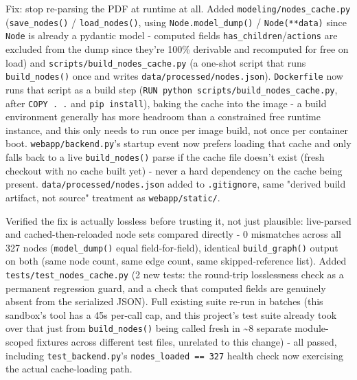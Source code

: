 Fix: stop re-parsing the PDF at runtime at all. Added \texttt{modeling/\allowbreak{}nodes\_\allowbreak{}cache.py} (\texttt{save\_\allowbreak{}nodes()} / \texttt{load\_\allowbreak{}nodes()}, using \texttt{Node.model\_\allowbreak{}dump()} / \texttt{Node(**data)} since \texttt{Node} is already a pydantic model - computed fields \texttt{has\_\allowbreak{}children}/\texttt{actions} are excluded from the dump since they're 100\% derivable and recomputed for free on load) and \texttt{scripts/\allowbreak{}build\_\allowbreak{}nodes\_\allowbreak{}cache.py} (a one-shot script that runs \texttt{build\_\allowbreak{}nodes()} once and writes \texttt{data/\allowbreak{}processed/\allowbreak{}nodes.json}). \texttt{Dockerfile} now runs that script as a build step (\texttt{RUN python scripts/\allowbreak{}build\_\allowbreak{}nodes\_\allowbreak{}cache.py}, after \texttt{COPY . .} and \texttt{pip install}), baking the cache into the image - a build environment generally has more headroom than a constrained free runtime instance, and this only needs to run once per image build, not once per container boot. \texttt{webapp/\allowbreak{}backend.py}'s startup event now prefers loading that cache and only falls back to a live \texttt{build\_\allowbreak{}nodes()} parse if the cache file doesn't exist (fresh checkout with no cache built yet) - never a hard dependency on the cache being present. \texttt{data/\allowbreak{}processed/\allowbreak{}nodes.json} added to \texttt{.gitignore}, same "derived build artifact, not source" treatment as \texttt{webapp/\allowbreak{}static/\allowbreak{}}.

Verified the fix is actually lossless before trusting it, not just plausible: live-parsed and cached-then-reloaded node sets compared directly - 0 mismatches across all 327 nodes (\texttt{model\_\allowbreak{}dump()} equal field-for-field), identical \texttt{build\_\allowbreak{}graph()} output on both (same node count, same edge count, same skipped-reference list). Added \texttt{tests/\allowbreak{}test\_\allowbreak{}nodes\_\allowbreak{}cache.py} (2 new tests: the round-trip losslessness check as a permanent regression guard, and a check that computed fields are genuinely absent from the serialized JSON). Full existing suite re-run in batches (this sandbox's tool has a 45s per-call cap, and this project's test suite already took over that just from \texttt{build\_\allowbreak{}nodes()} being called fresh in \textasciitilde{}8 separate module-scoped fixtures across different test files, unrelated to this change) - all passed, including \texttt{test\_\allowbreak{}backend.py}'s \texttt{nodes\_\allowbreak{}loaded == 327} health check now exercising the actual cache-loading path.

